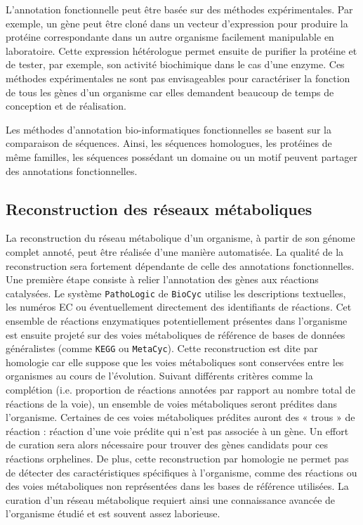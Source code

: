 \begin{refsegment}
    L'annotation fonctionnelle peut être basée sur des méthodes expérimentales. Par exemple, un gène peut être cloné dans un vecteur d'expression pour produire la protéine correspondante dans un autre organisme facilement manipulable en laboratoire. Cette expression hétérologue permet ensuite de purifier la protéine et de tester, par exemple, son activité biochimique dans le cas d'une enzyme. Ces méthodes expérimentales ne sont  pas envisageables pour caractériser la fonction de tous les gènes  d'un organisme car elles demandent beaucoup de temps de conception et de réalisation.
    
    Les méthodes d'annotation bio-informatiques fonctionnelles se basent sur la comparaison de séquences. Ainsi, les séquences homologues, les protéines de même familles, les séquences possédant un domaine ou un motif peuvent partager des annotations fonctionnelles.
    
    \subsection{Reconstruction des réseaux métaboliques}
    
    La reconstruction du réseau métabolique d'un organisme, à partir de son génome complet annoté, peut être réalisée d'une manière automatisée. La qualité de la reconstruction sera fortement dépendante de celle des annotations fonctionnelles. Une première étape consiste à relier l'annotation des gènes aux réactions catalysées. Le système \texttt{PathoLogic} de \texttt{BioCyc} utilise les descriptions textuelles, les numéros \gls{EC} ou éventuellement directement des identifiants de réactions.  Cet ensemble de réactions enzymatiques potentiellement présentes dans l'organisme est ensuite projeté sur des voies métaboliques de référence de bases de données généralistes (comme \texttt{KEGG} ou \texttt{MetaCyc}). Cette reconstruction est dite par homologie car elle suppose que les voies métaboliques sont conservées entre les organismes au cours de l'évolution. Suivant différents critères comme la complétion (i.e. proportion de réactions annotées par rapport au nombre total de réactions de la voie), un ensemble de voies métaboliques seront prédites  dans l'organisme. 
    Certaines de ces voies métaboliques prédites auront des « trous » de réaction : réaction d'une voie prédite qui n'est pas associée à un gène.  Un effort de curation sera alors nécessaire pour trouver des gènes candidats pour ces réactions orphelines. De plus,  cette reconstruction par homologie ne permet pas de détecter des caractéristiques spécifiques à l'organisme, comme des réactions ou des voies métaboliques non représentées dans les bases de référence utilisées. La curation d'un réseau métabolique requiert ainsi une connaissance avancée de l'organisme étudié et est souvent assez laborieuse. 
    

\end{refsegment}
